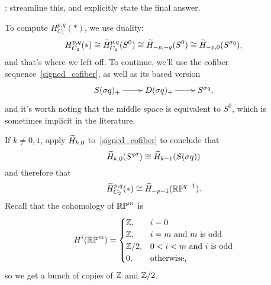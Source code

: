 
\TODO: streamline this, and explicitly state the final answer.

To compute $H_{C_2}^{p,q}(*)$, we use duality:
\[H_{C_2}^{p,q}(*) \cong \widetilde H^{p,q}_{C_2}(S^0)\cong \widetilde H_{-p,-q}(S^0)\cong \widetilde H_{-p,0}(S^{\sigma q}),\]
and that's where we left off. To continue, we'll use the cofiber sequence~\eqref{signed_cofiber}, as well as its
based version
\begin{equation}
\label{based_signed}
\xymatrix{
	S(\sigma q)_+\ar[r] & D(\sigma q)_+\ar[r] & S^{\sigma q},
}
\end{equation}
and it's worth noting that the middle space is equivalent to $S^0$, which is sometimes implicit in the literature.

If $k\ne 0,1$, apply $\widetilde H_{k,0}$ to~\eqref{signed_cofiber} to conclude that
\[\widetilde H_{k,0}(S^{q\sigma})\cong \widetilde H_{k-1}(S(\sigma q))\]
and therefore that
\[\widetilde H_{C_2}^{p,q}(*)\cong \widetilde H_{-p-1}(\mathbb{RP}^{q-1}).\]
Recall that the cohomology of $\mathbb{RP}^m$ is
\[H^i(\mathbb{RP}^m) = \begin{cases}
	\mathbb Z, &i = 0\\
	\mathbb Z, &i = m\text{ and $m$ is odd}\\
	\mathbb Z/2, &0 < i < m\text{ and $i$ is odd}\\
	0, &\text{otherwise,}
\end{cases}\]
so we get a bunch of copies of $\mathbb Z$ and $\mathbb Z/2$.

